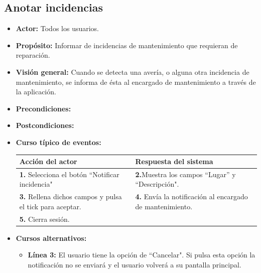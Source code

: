\documentclass[spanish,a4paper,11pt, twoside]{report}	%
\begin{document}
		\subsection{Anotar incidencias}	
			\begin{itemize}
				\item \textbf{Actor:} Todos los usuarios.
				\item \textbf{Propósito:} Informar de incidencias de mantenimiento que requieran de reparación. 		
				\item \textbf{Visión general:} Cuando se detecta una avería, o alguna otra incidencia de mantenimiento, se informa de ésta al encargado de mantenimiento a través de la aplicación.
				\item \textbf{Precondiciones:} 
				\item \textbf{Postcondiciones:}   
				\item \textbf{Curso típico de eventos:}\\ 
				\begin{tabular}{|p{6cm}||p{6cm}|}
					\hline
					\textbf{Acción del actor} & \textbf{Respuesta del sistema} \\ \hline \hline
					\textbf{1.} Selecciona el botón “Notificar incidencia" & \textbf{2.}Muestra los campos “Lugar'' y “Descripción".\\ \hline 
					\textbf{3.} Rellena dichos campos y pulsa el tick para aceptar. & \textbf{4.} Envía la notificación al encargado de mantenimiento.\\ \hline
					\textbf{5.} Cierra sesión. & \\ \hline

				\end{tabular}
				\item \textbf{Cursos alternativos:} 
					\begin{itemize}
						\item \textbf{Línea 3: }El usuario tiene la opción de “Cancelar". Si pulsa esta opción la notificación no se enviará y el usuario volverá a su pantalla principal.
					\end{itemize}
			\end {itemize}

		\hspace{0.5 true cm}
\end{document}
